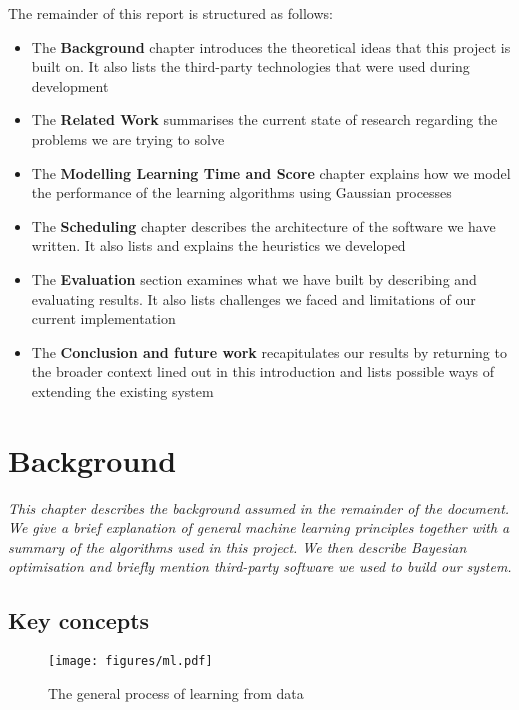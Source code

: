 \documentclass[a4paper,12pt,twoside,openright]{report}
\begin{document}
The remainder of this report is structured as follows:
\begin{itemize}
	\item The \textbf{Background} chapter introduces the theoretical ideas that this project is built on. It also lists the third-party technologies that were used during development
	\item The \textbf{Related Work} summarises the current state of research regarding the problems we are trying to solve
	\item The \textbf{Modelling Learning Time and Score} chapter explains how we model the performance of the learning algorithms using Gaussian processes
	\item The \textbf{Scheduling} chapter describes the architecture of the software we have written. It also lists and explains the heuristics we developed
	\item The \textbf{Evaluation} section examines what we have built by describing and evaluating results. It also lists challenges we faced and limitations of our current implementation
	\item The \textbf{Conclusion and future work} recapitulates our results by returning to the broader context lined out in this introduction and lists possible ways of extending the existing system
\end{itemize}






\chapter{Background}
\textit{This chapter describes the background assumed in the remainder of the document. We give a brief explanation of general machine learning principles together with a summary of the algorithms used in this project. We then describe Bayesian optimisation and briefly mention third-party software we used to build our system.}


\section{Key concepts}
\begin{figure}
\centering
  \texttt{[image: figures/ml.pdf]}
  \caption{The general process of learning from data}
  \label{mlstructure}
\end{figure}
\end{document}

